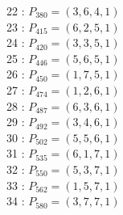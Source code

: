 \documentclass{article}
\begin{document}
{\begin{multicols}{2}
22 : $P_{380}=( 3, 6, 4, 1 )$\\
23 : $P_{415}=( 6, 2, 5, 1 )$\\
24 : $P_{420}=( 3, 3, 5, 1 )$\\
25 : $P_{446}=( 5, 6, 5, 1 )$\\
26 : $P_{450}=( 1, 7, 5, 1 )$\\
27 : $P_{474}=( 1, 2, 6, 1 )$\\
28 : $P_{487}=( 6, 3, 6, 1 )$\\
29 : $P_{492}=( 3, 4, 6, 1 )$\\
30 : $P_{502}=( 5, 5, 6, 1 )$\\
31 : $P_{535}=( 6, 1, 7, 1 )$\\
32 : $P_{550}=( 5, 3, 7, 1 )$\\
33 : $P_{562}=( 1, 5, 7, 1 )$\\
34 : $P_{580}=( 3, 7, 7, 1 )$\\
\end{multicols}
}
\end{document}
